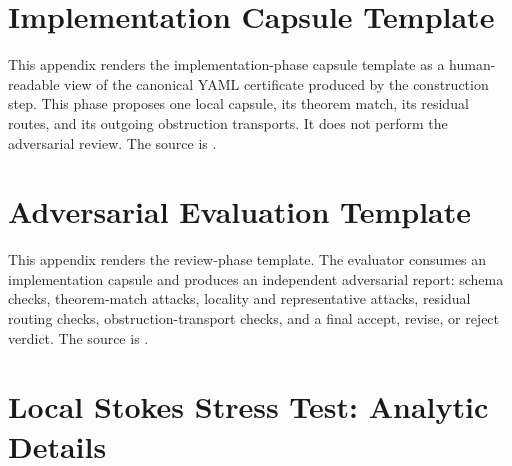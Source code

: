 \documentclass[11pt]{article}
\theoremstyle{plain}
\theoremstyle{definition}
\theoremstyle{remark}
\begin{document}
\appendix

\section{Implementation Capsule Template}
\label{app:implementation-capsule-template}

This appendix renders the implementation-phase capsule template as a
human-readable view of the canonical YAML certificate produced by the
construction step.  This phase proposes one local capsule, its theorem match,
its residual routes, and its outgoing obstruction transports.  It does not
perform the adversarial review.  The source is
.


\section{Adversarial Evaluation Template}
\label{app:adversarial-evaluation-template}

This appendix renders the review-phase template.  The evaluator consumes an
implementation capsule and produces an independent adversarial report: schema
checks, theorem-match attacks, locality and representative attacks, residual
routing checks, obstruction-transport checks, and a final accept, revise, or
reject verdict.  The source is
.


\section{Local Stokes Stress Test: Analytic Details}
\label{app:stokes-source}


\end{document}
